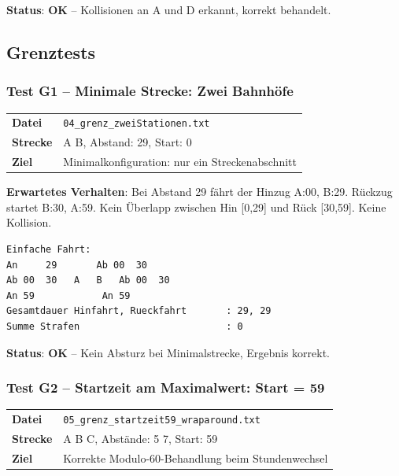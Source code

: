 \documentclass[12pt,a4paper]{article}
\newcommand{\pass}{\textcolor{passgreen}{\textbf{OK}}}
\begin{document}
\textbf{Status}: \pass{} -- Kollisionen an A und D erkannt, korrekt behandelt.

\subsection{Grenztests}

\subsubsection{Test G1 -- Minimale Strecke: Zwei Bahnhöfe}

\begin{center}
\begin{tabular}{ll}
\toprule
\textbf{Datei} & \texttt{04\_grenz\_zweiStationen.txt} \\
\textbf{Strecke} & A B, Abstand: 29, Start: 0 \\
\textbf{Ziel} & Minimalkonfiguration: nur ein Streckenabschnitt \\
\bottomrule
\end{tabular}
\end{center}

\textbf{Erwartetes Verhalten}: Bei Abstand 29 fährt der Hinzug A:00, B:29. Rückzug startet B:30, A:59. Kein Überlapp zwischen Hin [0,29] und Rück [30,59]. Keine Kollision.

\begin{lstlisting}[caption={Ausgabe G1}]
Einfache Fahrt:
An     29       Ab 00  30
Ab 00  30   A   B   Ab 00  30
An 59            An 59
Gesamtdauer Hinfahrt, Rueckfahrt       : 29, 29
Summe Strafen                          : 0
\end{lstlisting}

\textbf{Status}: \pass{} -- Kein Absturz bei Minimalstrecke, Ergebnis korrekt.

\subsubsection{Test G2 -- Startzeit am Maximalwert: Start = 59}

\begin{center}
\begin{tabular}{ll}
\toprule
\textbf{Datei} & \texttt{05\_grenz\_startzeit59\_wraparound.txt} \\
\textbf{Strecke} & A B C, Abstände: 5 7, Start: 59 \\
\textbf{Ziel} & Korrekte Modulo-60-Behandlung beim Stundenwechsel \\
\bottomrule
\end{tabular}
\end{center}
\end{document}

